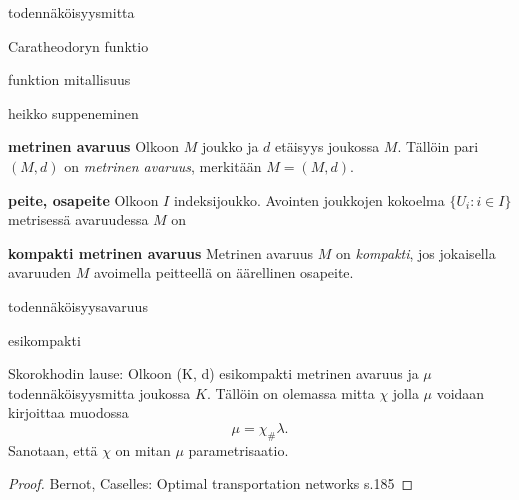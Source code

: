 \begin{definition}
    todennäköisyysmitta
\end{definition}


\begin{definition}
    Caratheodoryn funktio
\end{definition}



\begin{definition}
    funktion mitallisuus
\end{definition}

\begin{definition}
    heikko suppeneminen
\end{definition}


\begin{definition}
    \textbf{metrinen avaruus} Olkoon $M$ joukko ja $d$ etäisyys joukossa $M$. Tällöin pari $(M, d)$ on \textit{metrinen avaruus}, merkitään $M = (M, d)$.
\end{definition}

\begin{definition}
    \textbf{peite, osapeite} Olkoon $I$ indeksijoukko. Avointen joukkojen kokoelma $\{U_i \colon i \in I\}$ metrisessä avaruudessa $M$ on 
\end{definition}

\begin{definition}
    \textbf{kompakti metrinen avaruus} Metrinen avaruus $M$ on \textit{kompakti}, jos jokaisella avaruuden $M$ avoimella peitteellä on äärellinen osapeite.
\end{definition}
\begin{definition}
    todennäköisyysavaruus
\end{definition}


\begin{definition}
    esikompakti
\end{definition}

\begin{theorem}
    Skorokhodin lause: Olkoon (K, d) esikompakti metrinen avaruus ja $\mu$ todennäköisyysmitta joukossa $K$. Tällöin on olemassa mitta $\chi$ jolla  $\mu$ voidaan kirjoittaa muodossa
    $$ \mu = \chi_\# \lambda. $$
    Sanotaan, että $\chi$ on mitan $\mu$ parametrisaatio.
\end{theorem}
\begin{proof}
Bernot, Caselles: Optimal transportation networks s.185
\end{proof}

